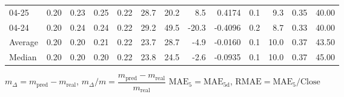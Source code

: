 \begin{threeparttable}
{\begin{tabular}{lrrrrrrrrrrrr}
  04-25 &          0.20 &          0.23 &          0.25 &        0.22 &                28.7 &                20.2 &        8.5 &       0.4174 &                 0.1 &              9.3 &            0.35 &                  40.00 \\
  04-24 &          0.20 &          0.24 &          0.24 &        0.22 &                29.2 &                49.5 &      -20.3 &      -0.4096 &                 0.2 &              8.7 &            0.33 &                  40.00 \\
Average &          0.20 &          0.20 &          0.21 &        0.22 &                23.7 &                28.7 &       -4.9 &      -0.0160 &                 0.1 &             10.0 &            0.37 &                  43.50 \\
 Median &          0.20 &          0.20 &          0.20 &        0.22 &                23.8 &                24.5 &       -2.6 &      -0.0935 &                 0.1 &             10.0 &            0.37 &                  45.00 \\
\bottomrule
\end{tabular}
}
\begin{tablenotes}\footnotesize
\item $m_\Delta=m_{\text{pred}}-m_{\text{real}}$,
$m_\Delta/m=\dfrac{m_{\text{pred}}-m_{\text{real}}}{m_{\text{real}}}$
$\mathrm{MAE}_5=\mathrm{MAE}_{5\text{d}}$,
$\mathrm{RMAE}=\mathrm{MAE}_5/\text{Close}$
\end{tablenotes}
\end{threeparttable}
\endgroup

